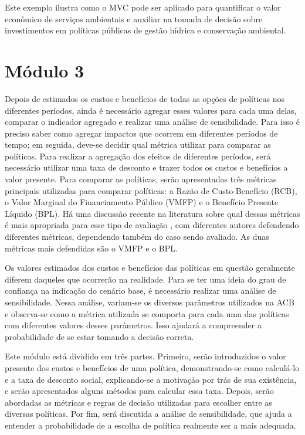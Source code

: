 \documentclass[12pt,letterpaper]{article}
\newcommand{\1}{\mathbbm{1}}
\numberwithin{equation}{section}
\begin{document}
Este exemplo ilustra como o MVC pode ser aplicado para quantificar o valor econômico de serviços ambientais e auxiliar na tomada de decisão sobre investimentos em políticas públicas de gestão hídrica e conservação ambiental. 
\newpage

\part*{Módulo 3}

Depois de estimados os custos e benefícios de todas as opções de políticas nos diferentes períodos, ainda é necessário agregar esses valores para cada uma delas, comparar o indicador agregado e realizar uma análise de sensibilidade. Para isso é preciso saber como agregar impactos que ocorrem em diferentes períodos de tempo; em seguida, deve-se decidir qual métrica utilizar para comparar as políticas. Para realizar a agregação dos efeitos de diferentes períodos, será necessário utilizar uma taxa de desconto e trazer todos os custos e benefícios a valor presente. Para comparar as políticas, serão apresentadas três métricas principais utilizadas para comparar políticas: a Razão de Custo-Benefício (RCB), o Valor Marginal do Financiamento Público (VMFP) e o Benefício Presente Líquido (BPL). Há uma discussão recente na literatura sobre qual dessas métricas é mais apropriada para esse tipo de avaliação \cite{garcia_criteria_2022,garcia_three_2022,hendren_unified_2020,hendren_case_2022}, com diferentes autores defendendo diferentes métricas, dependendo também do caso sendo avaliado. As duas métricas mais defendidas são o VMFP e o BPL.

Os valores estimados dos custos e benefícios das políticas em questão geralmente diferem daqueles que ocorrerão na realidade. Para se ter uma ideia do grau de confiança na indicação do cenário base, é necessário realizar uma análise de sensibilidade. Nessa análise, variam-se os diversos parâmetros utilizados na ACB e observa-se como a métrica utilizada se comporta para cada uma das políticas com diferentes valores desses parâmetros. Isso ajudará a compreender a probabilidade de se estar tomando a decisão correta.

Este módulo está dividido em três partes. Primeiro, serão introduzidos o valor presente dos custos e benefícios de uma política, demonstrando-se como calculá-lo e a taxa de desconto social, explicando-se a motivação por trás de sua existência, e serão apresentados alguns métodos para calcular essa taxa. Depois, serão abordadas as métricas e regras de decisão utilizadas para escolher entre as diversas políticas. Por fim, será discutida a análise de sensibilidade, que ajuda a entender a probabilidade de a escolha de política realmente ser a mais adequada.
\end{document}
